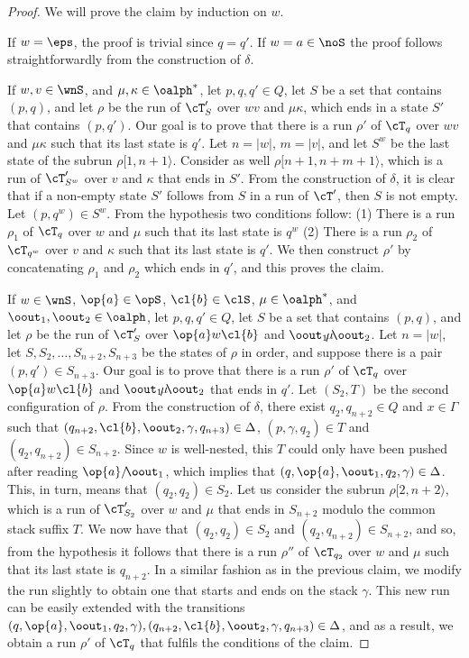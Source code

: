 \begin{proof}
	We will prove the claim by induction on $w$.
	
	If $w = \eps$, the proof is trivial since $q = q'$. If $w = a\in\noS$ the proof follows straightforwardly from the construction of $\delta$.
	
	If $w,v\in\wnS$, and $\mu, \kappa \in \oalph^*$, let $p,q,q'\in Q$, let $S$ be a set that contains $(p,q)$, and let $\rho$ be the run of $\cT'_S$ over $wv$ and $\mu\kappa$, which ends in a state $S'$ that contains $(p,q')$. 
	Our goal is to prove that there is a run $\rho'$ of $\cT_q$ over $wv$ and $\mu\kappa$ such that its last state is $q'$.
	Let $n = \vert w\vert$, $m = \vert v \vert$, and let $S^w$ be the last state of the subrun $\rho[1,n+1\rangle$. 
	Consider as well $\rho[n+1,n+m+1\rangle$, which is a run of $\cT'_{S^w}$ over $v$ and $\kappa$ that ends in $S'$.
	From the construction of $\delta$, it is clear that if a non-empty state $S'$ follows from $S$ in a run of $\cT'$, then $S$ is not empty.
	Let $(p,q^w)\in S^w$.
	From the hypothesis two conditions follow: 
	(1) There is a run $\rho_1$ of $\cT_q$ over $w$ and $\mu$ such that its last state is $q^w$
	(2) There is a run $\rho_2$ of $\cT_{q^w}$ over $v$ and $\kappa$ such that its last state is $q'$. 
	We then construct $\rho'$ by concatenating $\rho_1$ and $\rho_2$ which ends in $q'$, and this proves the claim.
	
	If $w\in\wnS$, $\op{a}\in\opS$, $\cl{b}\in\clS$, $\mu\in\oalph^*$, and $\oout_1,\oout_2\in\oalph$, let $p,q,q'\in Q$, let $S$ be a set that contains $(p,q)$, and let $\rho$ be the run of $\cT'_S$ over $\op{a}w\cl{b}$ and $\oout_1\!\mu\!\oout_2$. 
	Let $n = \vert w\vert$, let $S, S_2, \ldots, S_{n+2}, S_{n+3}$ be the states of $\rho$ in order, and suppose there is a pair $(p,q')\in S_{n+3}$.
	Our goal is to prove that there is a run $\rho'$ of $\cT_q$ over $\op{a}w\cl{b}$ and $\oout_1\!\mu\!\oout_2$ that ends in $q'$. 
	Let $(S_2,T)$ be the second configuration of $\rho$.
	From the construction of $\delta$, there exist $q_2,q_{n+2}\in Q$ and $x\in\Gamma$ such that $(q_{n+2},\cl{b},\oout_2,\gamma,q_{n+3})\in\Delta$, $(p,\gamma,q_2)\in T$ and $(q_2,q_{n+2})\in S_{n+2}$.
	Since $w$ is well-nested, this $T$ could only have been pushed after reading $\op{a}/\!\oout_1$, which implies that $(q,\op{a},\oout_1,q_2,\gamma)\in\Delta$. This, in turn, means that $(q_2,q_2)\in S_2$.
	Let us consider the subrun $\rho[2,n+2\rangle$, which is a run of $\cT'_{S_2}$ over $w$ and $\mu$ that ends in $S_{n+2}$ modulo the common stack suffix $T$.
	We now have that $(q_2,q_2)\in S_2$ and $(q_2,q_{n+2})\in S_{n+2}$, and so, from the hypothesis it follows that there is a run $\rho''$ of $\cT_{q_2}$ over $w$ and $\mu$ such that its last state is $q_{n+2}$.
	In a similar fashion as in the previous claim, we modify the run slightly to obtain one that starts and ends on the stack $\gamma$.
	This new run can be easily extended with the transitions $(q,\op{a},\oout_1,q_2,\gamma),(q_{n+2},\cl{b},\oout_2,\gamma,q_{n+3})\in\Delta$, and as a result, we obtain a run $\rho'$ of $\cT_q$ that fulfils the conditions of the claim.
\end{proof}


